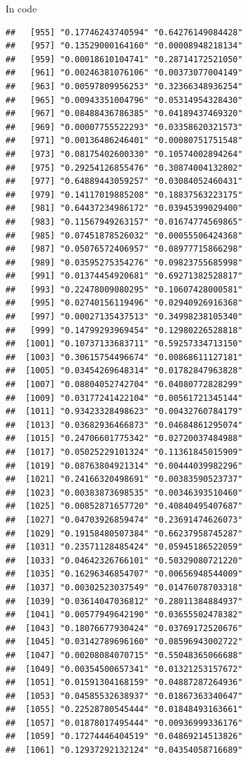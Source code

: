 \documentclass[ignorenonframetext,]{beamer}
\begin{document}
\begin{frame}[fragile]{In code}
\begin{verbatim}
##   [955] "0.17746243740594" "0.64276149084428"
##   [957] "0.13529000164160" "0.00008948218134"
##   [959] "0.00018610104741" "0.28714172521050"
##   [961] "0.00246381076106" "0.00373077004149"
##   [963] "0.00597809956253" "0.32366348936254"
##   [965] "0.00943351004796" "0.05314954328430"
##   [967] "0.08488436786385" "0.04189437469320"
##   [969] "0.00007755522293" "0.03358620321573"
##   [971] "0.00136486246401" "0.00080751751548"
##   [973] "0.08175402600330" "0.10574002894264"
##   [975] "0.29254126855476" "0.30874004132802"
##   [977] "0.64889443059257" "0.03084052460431"
##   [979] "0.14117019885208" "0.18837563223175"
##   [981] "0.64437234986172" "0.03945399029400"
##   [983] "0.11567949263157" "0.01674774569865"
##   [985] "0.07451878526032" "0.00055506424368"
##   [987] "0.05076572406957" "0.08977715866298"
##   [989] "0.03595275354276" "0.09823755685998"
##   [991] "0.01374454920681" "0.69271382528817"
##   [993] "0.22478009080295" "0.10607428000581"
##   [995] "0.02740156119496" "0.02940926916368"
##   [997] "0.00027135437513" "0.34998238105340"
##   [999] "0.14799293969454" "0.12980226528818"
##  [1001] "0.10737133683711" "0.59257334713150"
##  [1003] "0.30615754496674" "0.00868611127181"
##  [1005] "0.03454269648314" "0.01782847963828"
##  [1007] "0.08804052742704" "0.04080772828299"
##  [1009] "0.03177241422104" "0.00561721345144"
##  [1011] "0.93423328498623" "0.00432760784179"
##  [1013] "0.03682936466873" "0.04684861295074"
##  [1015] "0.24706601775342" "0.02720037484988"
##  [1017] "0.05025229101324" "0.11361845015909"
##  [1019] "0.08763804921314" "0.00444039982296"
##  [1021] "0.24166320498691" "0.00383590523737"
##  [1023] "0.00383873698535" "0.00346393510460"
##  [1025] "0.00852871657720" "0.40840495407687"
##  [1027] "0.04703926859474" "0.23691474626073"
##  [1029] "0.19158480507384" "0.66237958745287"
##  [1031] "0.23571128485424" "0.05945186522059"
##  [1033] "0.04642326766101" "0.50329080721220"
##  [1035] "0.16296346854707" "0.00656948544009"
##  [1037] "0.00302523037549" "0.01476078703318"
##  [1039] "0.03614047036812" "0.28011384884937"
##  [1041] "0.00577949642190" "0.03655502478382"
##  [1043] "0.18076677930424" "0.03769172520676"
##  [1045] "0.03142789696160" "0.08596943002722"
##  [1047] "0.00208084070715" "0.55048365066688"
##  [1049] "0.00354500657341" "0.01321253157672"
##  [1051] "0.01591304168159" "0.04887287264936"
##  [1053] "0.04585532638937" "0.01867363340647"
##  [1055] "0.22528780545444" "0.01848493163661"
##  [1057] "0.01878017495444" "0.00936999336176"
##  [1059] "0.17274446404519" "0.04869214513826"
##  [1061] "0.12937292132124" "0.04354058716689"

\end{verbatim}
\end{frame}
\end{document}
